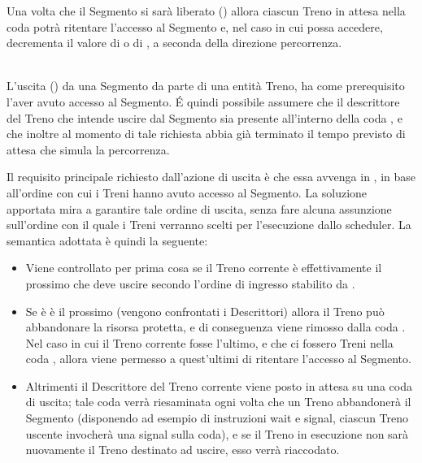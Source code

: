 \begin{description}
			Una volta che il Segmento si sarà liberato () allora ciascun Treno in attesa nella coda  potrà ritentare l'accesso al Segmento e, nel caso in cui possa accedere, decrementa il valore di  o di , a seconda della direzione percorrenza.
			  
			\item {} \\ 
			
			L'uscita () da una Segmento da parte di una entità Treno, ha come prerequisito l'aver avuto accesso al Segmento. \'E quindi possibile assumere che il descrittore del Treno che intende uscire dal Segmento sia presente all'interno della coda , e che inoltre al momento di tale richiesta abbia già terminato il tempo previsto di attesa che simula la percorrenza.
			
			Il requisito principale richiesto dall'azione di uscita è che essa avvenga in , in base all'ordine con cui i Treni hanno avuto accesso al Segmento. La soluzione apportata mira a garantire tale ordine di uscita, senza fare alcuna assunzione sull'ordine con il quale i Treni verranno scelti per l'esecuzione dallo scheduler. La semantica adottata è quindi la seguente:
			\begin{itemize}
				 \item Viene controllato per prima cosa se il Treno corrente è effettivamente il prossimo che deve uscire secondo l'ordine di ingresso stabilito da .
				 \item Se è è il prossimo (vengono confrontati i Descrittori) allora il Treno può abbandonare la risorsa protetta, e di conseguenza viene rimosso dalla coda . Nel caso in cui il Treno corrente fosse l'ultimo, e che ci fossero Treni nella coda , allora viene permesso a quest'ultimi di ritentare l'accesso al Segmento.
				 \item Altrimenti il Descrittore del Treno corrente viene posto in attesa su una coda di uscita; tale coda verrà riesaminata ogni volta che un Treno abbandonerà il Segmento (disponendo ad esempio di instruzioni wait e signal, ciascun Treno uscente invocherà una signal sulla coda), e se il Treno in esecuzione non sarà nuovamente il Treno destinato ad uscire, esso verrà riaccodato. 
			\end{itemize}
		\end {description}
	
